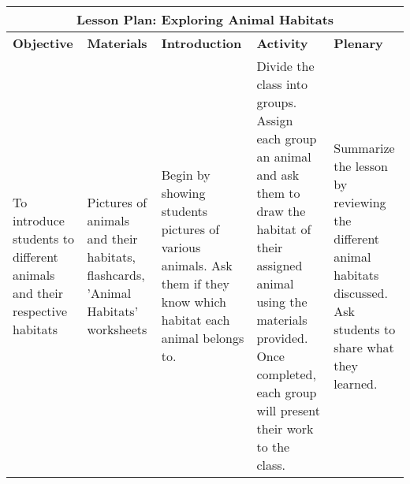 \documentclass{article}
\begin{document}
\begin{tabular}{|p{3cm}|p{3cm}|p{3cm}|p{3cm}|p{3cm}|}
\hline
\multicolumn{5}{|c|}{\textbf{Lesson Plan: Exploring Animal Habitats}} \\
\hline
\textbf{Objective} & \textbf{Materials} & \textbf{Introduction} & \textbf{Activity} & \textbf{Plenary} \\
\hline
To introduce students to different animals and their respective habitats & Pictures of animals and their habitats, flashcards, 'Animal Habitats' worksheets & Begin by showing students pictures of various animals. Ask them if they know which habitat each animal belongs to. & Divide the class into groups. Assign each group an animal and ask them to draw the habitat of their assigned animal using the materials provided. Once completed, each group will present their work to the class. & Summarize the lesson by reviewing the different animal habitats discussed. Ask students to share what they learned. \\
\hline
\end{tabular}
\end{document}
